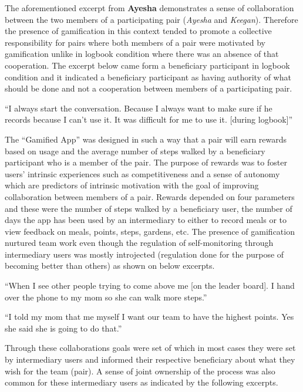 The aforementioned excerpt from \textbf{Ayesha} demonstrates a sense of collaboration between the two members of a participating pair (\emph{Ayesha} and \emph{Keegan}). Therefore the presence of gamification in this context tended to promote a collective responsibility for pairs where both members of a pair were motivated by gamification unlike in logbook condition where there was an absence of that cooperation. The excerpt below came form a beneficiary participant in logbook condition and it indicated a beneficiary participant as having authority of what should be done and not a cooperation between members of a participating pair. 

 {``I always start the conversation. Because I always want to make sure if he records because I can't use it. It was difficult for me to use it. [during logbook]''}

The ``Gamified App'' was designed in such a way that a pair will earn rewards based on usage and the average number of steps walked by a beneficiary participant who is a member of the pair. The purpose of rewards was to foster users' intrinsic experiences such as competitiveness and a sense of autonomy which are predictors of intrinsic motivation with the goal of improving collaboration between members of a pair. Rewards depended on four parameters and these were the number of steps walked by a beneficiary user, the number of days the app has been used by an intermediary to either to record meals or to view feedback on meals, points, steps, gardens, etc. The presence of gamification nurtured  team work  even though the regulation of self-monitoring through intermediary users was mostly introjected (regulation done for the purpose of becoming better than others) as shown on below excerpts.

 {``When I see other people trying to come above me [on the leader board]. I hand over the phone to my mom so she can walk more steps.''}

 {``I told my mom that me myself I want our team to have the highest points. Yes she said she is going to do that.''}

Through these collaborations goals were set of which in most cases they were set by intermediary users and informed their respective beneficiary about what they wish for the team (pair). A sense of joint ownership of the process was also common for these intermediary users as indicated by the following excerpts. 

